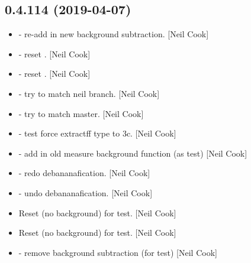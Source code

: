 \documentclass[a4paper,10pt,english]{report}
\begin{document}
\subsection{0.4.114 (2019-04-07)}
\label{\detokenize{misc/changelog:id146}}\begin{itemize}
\item {} 
 - re-add in new background subtraction. {[}Neil
Cook{]}

\item {} 
 - reset . {[}Neil Cook{]}

\item {} 
 - reset . {[}Neil Cook{]}

\item {} 
 - try to match neil branch. {[}Neil Cook{]}

\item {} 
 - try to match master. {[}Neil Cook{]}

\item {} 
 - test force extractff type to 3c. {[}Neil Cook{]}

\item {} 
 - add in old measure background function (as test) {[}Neil
Cook{]}

\item {} 
 - redo debananafication. {[}Neil Cook{]}

\item {} 
 - undo debananafication. {[}Neil Cook{]}

\item {} 
Reset  (no background) for test. {[}Neil Cook{]}

\item {} 
Reset  (no background) for test. {[}Neil Cook{]}

\item {} 
 - remove background subtraction (for test) {[}Neil
Cook{]}

\end{itemize}
\end{document}
